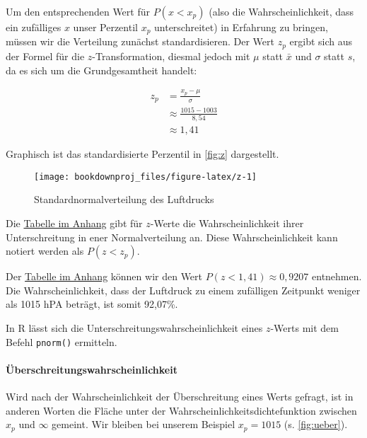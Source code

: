 \documentclass[
  ngerman,
]{article}
\begin{document}
Um den entsprechenden Wert für \(P(x < x_p)\) (also die Wahrscheinlichkeit, dass ein zufälliges \(x\) unser Perzentil \(x_p\) unterschreitet) in Erfahrung zu bringen, müssen wir die Verteilung zunächst standardisieren. Der Wert \(z_p\) ergibt sich aus der Formel für die \(z\)-Transformation, diesmal jedoch mit \(\mu\) statt \(\bar{x}\) und \(\sigma\) statt \(s\), da es sich um die Grundgesamtheit handelt:

\[\begin{aligned}
    z_p &= \frac{x_p-\mu}{\sigma} \\[4pt]
        &\approx \frac{1015-1003}{8,54}\\[4pt]
        &\approx 1,41
  \end{aligned}
\]

Graphisch ist das standardisierte Perzentil in \autoref{fig:z} dargestellt.

\begin{figure}[H]

{\centering \texttt{[image: bookdownproj\_files/figure-latex/z-1]} 

}

\caption{Standardnormalverteilung des Luftdrucks}\label{fig:z}
\end{figure}

Die \protect\hyperlink{ptab}{Tabelle im Anhang} gibt für \(z\)-Werte die Wahrscheinlichkeit ihrer Unterschreitung in ener Normalverteilung an. Diese Wahrscheinlichkeit kann notiert werden als \(P(z<z_p)\).

Der \protect\hyperlink{ptab}{Tabelle im Anhang} können wir den Wert \(P(z < 1,41) \approx 0,9207\) entnehmen. Die Wahrscheinlichkeit, dass der Luftdruck zu einem zufälligen Zeitpunkt weniger als 1015 hPA beträgt, ist somit 92,07\%.

\begin{rtip}
In R lässt sich die Unterschreitungswahrscheinlichkeit eines $z$-Werts mit dem Befehl {\tt pnorm()} ermitteln.
\end{rtip}

\hypertarget{uxfcberschreitungswahrscheinlichkeit}{%
\paragraph{Überschreitungswahrscheinlichkeit}\label{uxfcberschreitungswahrscheinlichkeit}}

Wird nach der Wahrscheinlichkeit der Überschreitung eines Werts gefragt, ist in anderen Worten die Fläche unter der Wahrscheinlichkeitsdichtefunktion zwischen \(x_p\) und \(\infty\) gemeint. Wir bleiben bei unserem Beispiel \(x_p=1015\) (s. \autoref{fig:ueber}).
\end{document}

